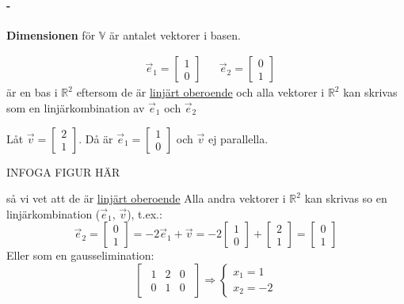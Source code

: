 \paragraph{-} %
\label{par:dimension_}
\textbf{Dimensionen} för $\mathbb{V}$ är antalet vektorer i basen.
\begin{Ex}
	\begin{align*}
	&\vec{e}_1 = \begin{bmatrix} 1\\0 \end{bmatrix}
	&&\vec{e}_2 = \begin{bmatrix} 0\\1 \end{bmatrix}
	\end{align*}
	är en bas i $\mathbb{R}^2$ eftersom de är \underline{linjärt oberoende} och alla vektorer i $\mathbb{R}^2$ kan skrivas som en linjärkombination av $\vec{e}_1$ och $\vec{e}_2$
\end{Ex}
\begin{Ex}
	Låt $\vec{v} = \begin{bmatrix} 2\\1 \end{bmatrix}$. Då är $\vec{e}_1 = \begin{bmatrix} 1\\0 \end{bmatrix}$ och $\vec{v}$ ej parallella.
	\begin{center}
		INFOGA FIGUR HÄR
	\end{center}
	så vi vet att de är \underline{linjärt oberoende}
	Alla andra vektorer i $\mathbb{R}^2$ kan skrivas so en linjärkombination ($\vec{e}_1$, $\vec{v}$), t.ex.:
	\[
	\vec{e}_2 = \begin{bmatrix} 0\\1 \end{bmatrix} = -2 \vec{e}_1 + \vec{v} = -2 \begin{bmatrix} 1\\0 \end{bmatrix} + \begin{bmatrix} 2\\1 \end{bmatrix} = \begin{bmatrix} 0\\1 \end{bmatrix}
	\]
	Eller som en gausselimination:
	\[
	\begin{bmatrix}
		\begin{array}{cc|c}
			1 & 2 & 0\\
			0 & 1 & 0
		\end{array}
	\end{bmatrix}
	\Rightarrow
	\begin{cases}
		x_1 = 1\\
		x_2 = -2
	\end{cases}
	\]
\end{Ex}
